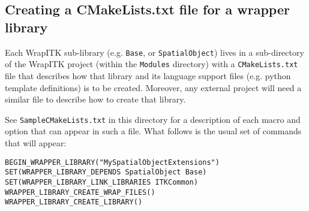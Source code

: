 \documentclass{InsightArticle}
\begin{document}
     \subsection{Creating a CMakeLists.txt file for a wrapper library}
Each WrapITK sub-library (e.g. \verb$Base$, or \verb$SpatialObject$) lives in a
sub-directory of the WrapITK project (within the \verb$Modules$ directory) with a
\verb$CMakeLists.txt$ file that describes how that library and its language support files
(e.g. python template definitions) is to be created. Moreover, any external
project will need a similar file to describe how to create that library.

See \verb$SampleCMakeLists.txt$ in this directory for a description of each macro and
option that can appear in such a file. What follows is the usual set of commands
that will appear:

\small \begin{verbatim}
BEGIN_WRAPPER_LIBRARY("MySpatialObjectExtensions")
SET(WRAPPER_LIBRARY_DEPENDS SpatialObject Base)
SET(WRAPPER_LIBRARY_LINK_LIBRARIES ITKCommon)
WRAPPER_LIBRARY_CREATE_WRAP_FILES()
WRAPPER_LIBRARY_CREATE_LIBRARY()
\end{verbatim} \normalsize
\end{document}
